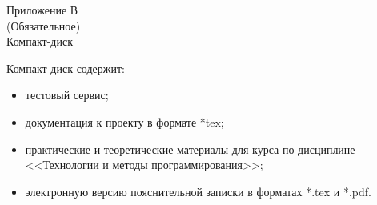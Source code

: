 \begin{center}
Приложение В\\
(Обязательное)\\
Компакт-диск
\end{center}
\vspace{\baselineskip}

Компакт-диск содержит: 
\begin{itemize}
\item тестовый сервис;
\item документация к проекту в формате *tex;
\item практические и теоретические материалы для курса по дисциплине <<Технологии и методы программирования>>;
\item электронную версию пояснительной записки в форматах *.tex и *.pdf.
\end{itemize}
\clearpage